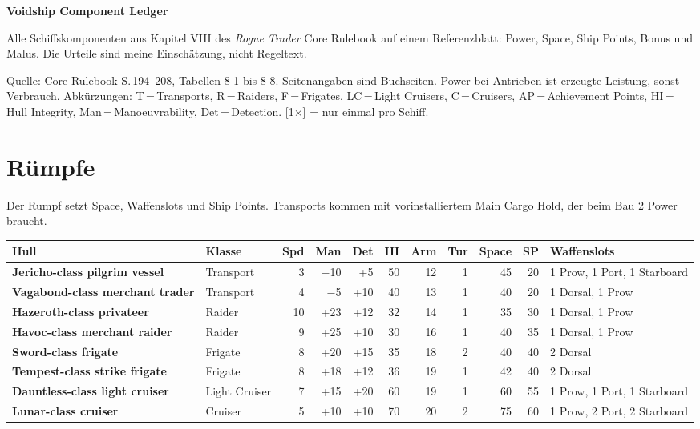 \documentclass[9pt,a4paper]{extarticle}
\newcommand{\nm}[1]{\textbf{#1}}
\newcommand{\src}[1]{\hfill\raisebox{3pt}{\monofont\footnotesize\color{ink3}#1}}
\newcommand{\once}{{\monofont\scriptsize\color{ink3}[1×]}}
\begin{document}
{\headfont\Huge\bfseries Voidship Component Ledger\par}
\vspace{2pt}
{\color{ink2}Alle Schiffskomponenten aus Kapitel VIII des \emph{Rogue Trader} Core Rulebook auf einem Referenzblatt: Power, Space, Ship Points, Bonus und Malus. Die Urteile sind meine Einschätzung, nicht Regeltext.\par}
\vspace{4pt}
{\footnotesize\color{ink3}Quelle: Core Rulebook S.\,194--208, Tabellen 8-1 bis 8-8. Seitenangaben sind Buchseiten. Power bei Antrieben ist erzeugte Leistung, sonst Verbrauch.
Abkürzungen: T\,=\,Transports, R\,=\,Raiders, F\,=\,Frigates, LC\,=\,Light Cruisers, C\,=\,Cruisers, AP\,=\,Achievement Points, HI\,=\,Hull Integrity, Man\,=\,Manoeuvrability, Det\,=\,Detection. \once{} = nur einmal pro Schiff.\par}

\vspace{4pt}
{\footnotesize\tableofcontents}

\section{Rümpfe \src{S. 194--196}}
Der Rumpf setzt Space, Waffenslots und Ship Points. Transports kommen mit vorinstalliertem Main Cargo Hold, der beim Bau 2 Power braucht.

\begin{xltabular}{\linewidth}{l H N N N N N N N N Y}
\toprule
{}\textbf{Hull} & \textbf{Klasse} & \textbf{Spd} & \textbf{Man} & \textbf{Det} & \textbf{HI} & \textbf{Arm} & \textbf{Tur} & \textbf{Space} & \textbf{SP} & \textbf{Waffenslots}\\
\midrule
\endhead
\nm{Jericho-class pilgrim vessel} & Transport & 3 & −10 & +5 & 50 & 12 & 1 & 45 & 20 & 1 Prow, 1 Port, 1 Starboard\\
\nm{Vagabond-class merchant trader} & Transport & 4 & −5 & +10 & 40 & 13 & 1 & 40 & 20 & 1 Dorsal, 1 Prow\\
\nm{Hazeroth-class privateer} & Raider & 10 & +23 & +12 & 32 & 14 & 1 & 35 & 30 & 1 Dorsal, 1 Prow\\
\nm{Havoc-class merchant raider} & Raider & 9 & +25 & +10 & 30 & 16 & 1 & 40 & 35 & 1 Dorsal, 1 Prow\\
\nm{Sword-class frigate} & Frigate & 8 & +20 & +15 & 35 & 18 & 2 & 40 & 40 & 2 Dorsal\\
\nm{Tempest-class strike frigate} & Frigate & 8 & +18 & +12 & 36 & 19 & 1 & 42 & 40 & 2 Dorsal\\
\nm{Dauntless-class light cruiser} & Light Cruiser & 7 & +15 & +20 & 60 & 19 & 1 & 60 & 55 & 1 Prow, 1 Port, 1 Starboard\\
\nm{Lunar-class cruiser} & Cruiser & 5 & +10 & +10 & 70 & 20 & 2 & 75 & 60 & 1 Prow, 2 Port, 2 Starboard\\
\bottomrule
\end{xltabular}
\end{document}
